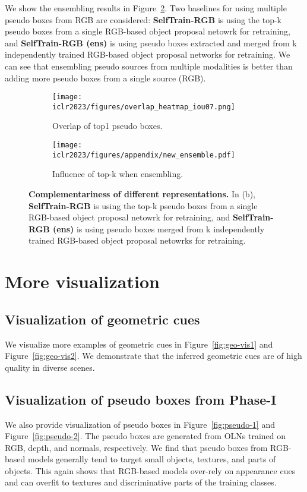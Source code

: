 \documentclass{article} \usepackage{iclr2023_conference,times}
\begin{document}
We show the ensembling results in Figure~\ref{fig:topk_ensemble}.
Two baselines for using multiple pseudo boxes from RGB are considered: \textbf{SelfTrain-RGB} is using the top-k pseudo boxes from a single RGB-based object proposal netowrk for retraining, and \textbf{SelfTrain-RGB (ens)} is using pseudo boxes extracted and merged from k independently trained RGB-based object proposal networks for retraining.  We can see that ensembling pseudo sources from multiple modalities is  better than adding more pseudo boxes from a single source (RGB).


\begin{figure}[t]
    \centering
    \begin{subfigure}[b]{0.5\textwidth}
         \centering
         \texttt{[image: iclr2023/figures/overlap\_heatmap\_iou07.png]}
    \caption{Overlap of top1 pseudo boxes.}
         \label{fig:overlap}
     \end{subfigure}
     \hfill
     \begin{subfigure}[b]{0.49\textwidth}
         \centering
         \texttt{[image: iclr2023/figures/appendix/new\_ensemble.pdf]}
         \caption{Influence of top-k when ensembling.}
         \label{fig:topk_ensemble}
     \end{subfigure}
    \caption{\textbf{Complementariness of different representations.} In (b), \textbf{SelfTrain-RGB} is using the top-k pseudo boxes from a single RGB-based object proposal netowrk for retraining, and \textbf{SelfTrain-RGB (ens)} is using pseudo boxes merged from k independently trained RGB-based object proposal netowrks for retraining.}
    \label{fig:complementary}
\end{figure}


 


\section{More visualization} 
\subsection{Visualization of geometric cues}
We visualize more examples of geometric cues in Figure~\ref{fig:geo-vis1} and Figure~\ref{fig:geo-vis2}. We demonstrate that the inferred geometric cues are of high quality in diverse scenes.

\subsection{Visualization of pseudo boxes from Phase-I}
We also provide visualization of pseudo boxes in Figure~\ref{fig:pseudo-1} and Figure~\ref{fig:pseudo-2}. 
The pseudo boxes are generated from OLNs trained on RGB, depth, and normals, respectively.
We find that pseudo boxes from RGB-based models generally tend to target small objects, textures, and parts of objects. This  again shows that RGB-based models over-rely on appearance cues and can overfit to textures and discriminative parts of the training classes.
\end{document}
